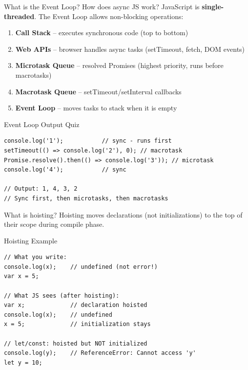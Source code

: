 \documentclass[12pt,a4paper]{article}
\begin{document}
\begin{qbox}{What is the Event Loop? How does async JS work?}
JavaScript is \textbf{single-threaded}. The Event Loop allows non-blocking operations:
\begin{enumerate}[leftmargin=2em, noitemsep]
    \item \textbf{Call Stack} -- executes synchronous code (top to bottom)
    \item \textbf{Web APIs} -- browser handles async tasks (setTimeout, fetch, DOM events)
    \item \textbf{Microtask Queue} -- resolved Promises (highest priority, runs before macrotasks)
    \item \textbf{Macrotask Queue} -- setTimeout/setInterval callbacks
    \item \textbf{Event Loop} -- moves tasks to stack when it is empty
\end{enumerate}
\begin{codebox}{Event Loop Output Quiz}
\begin{lstlisting}
console.log('1');           // sync - runs first
setTimeout(() => console.log('2'), 0); // macrotask
Promise.resolve().then(() => console.log('3')); // microtask
console.log('4');           // sync

// Output: 1, 4, 3, 2
// Sync first, then microtasks, then macrotasks
\end{lstlisting}
\end{codebox}
\end{qbox}

\begin{qbox}{What is hoisting?}
Hoisting moves declarations (not initializations) to the top of their scope during compile phase.
\begin{codebox}{Hoisting Example}
\begin{lstlisting}
// What you write:
console.log(x);    // undefined (not error!)
var x = 5;

// What JS sees (after hoisting):
var x;             // declaration hoisted
console.log(x);    // undefined
x = 5;             // initialization stays

// let/const: hoisted but NOT initialized
console.log(y);    // ReferenceError: Cannot access 'y'
let y = 10;
\end{lstlisting}
\end{codebox}
\end{qbox}

\newpage
\end{document}

